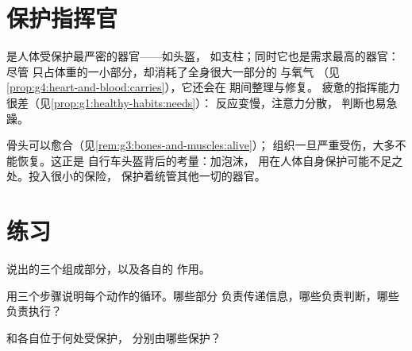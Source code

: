 \section{保护指挥官}

\begin{proposition}[睡眠、食物与安全]\label{prop:g5:brain-in-command:protect}
是人体受保护最严密的器官——如头盔，
如支柱；同时它也是需求最高的器官：尽管
只占体重的一小部分，却消耗了全身很大一部分的
与氧气
（见\cref{prop:g4:heart-and-blood:carries}），它还会在
\emph{}期间整理与修复。
疲惫的指挥能力很差（见\cref{prop:g1:healthy-habits:needs}）：
反应变慢，注意力分散，
判断也易急躁。
\end{proposition}
\admitted

\begin{example}[头盔是为了保护这个循环]\label{ex:g5:brain-in-command:helmet}
骨头可以愈合（见\cref{rem:g3:bones-and-muscles:alive}）；
组织一旦严重受伤，大多不能恢复。这正是
自行车头盔背后的考量：加泡沫，
用在人体自身保护可能不足之处。投入很小的保险，
保护着统管其他一切的器官。
\end{example}

\section{练习}

\begin{exercise}[$\star$]\label{exo:g5:brain-in-command:1}
说出的三个组成部分，以及各自的
作用。
\end{exercise}

\begin{exercise}[$\star$]\label{exo:g5:brain-in-command:2}
用三个步骤说明每个动作的循环。哪些部分
负责传递信息，哪些负责判断，哪些负责执行？
\end{exercise}

\begin{exercise}[$\star$]\label{exo:g5:brain-in-command:3}
和各自位于何处受保护，
分别由哪些保护？
\end{exercise}


